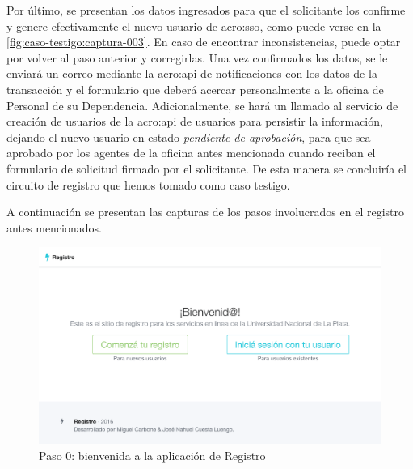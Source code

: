Por último, se presentan los datos ingresados para que el solicitante los confirme y genere efectivamente el nuevo usuario de \gls{acro:sso}, como puede verse en la \autoref{fig:caso-testigo:captura-003}. En caso de encontrar inconsistencias, puede optar por volver al paso anterior y corregirlas. Una vez confirmados los datos, se le enviará un correo mediante la \gls{acro:api} de notificaciones con los datos de la transacción y el formulario que deberá acercar personalmente a la oficina de Personal de su Dependencia. Adicionalmente, se hará un llamado al servicio de creación de usuarios de la \gls{acro:api} de usuarios para persistir la información, dejando el nuevo usuario en estado \textit{pendiente de aprobación}, para que sea aprobado por los agentes de la oficina antes mencionada cuando reciban el formulario de solicitud firmado por el solicitante. De esta manera se concluiría el circuito de registro que hemos tomado como caso testigo.

A continuación se presentan las capturas de los pasos involucrados en el registro antes mencionados.

\newpage

\begin{figure}[H]
  \centering
  \includegraphics[width=\textwidth,keepaspectratio]{src/images/05-capitulo-5/capturas/page_000.png}
  \caption{Paso 0: bienvenida a la aplicación de Registro}
  \label{fig:caso-testigo:captura-000}
\end{figure}

